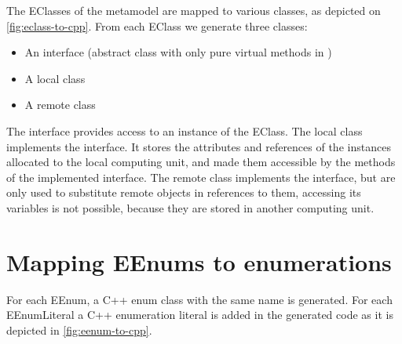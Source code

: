 The EClasses of the metamodel are mapped to various \cpp{} classes, as depicted on \mbox{\autoref{fig:eclass-to-cpp}}.
From each EClass we generate three \cpp{} classes:

\begin{itemize}
	\item An interface (abstract class with only pure virtual methods in \cpp{})
	\item A local class
	\item A remote class
\end{itemize}


The interface provides access to an instance of the EClass.
The local class implements the interface. It stores the attributes and references of the instances allocated to the local computing unit, and made them accessible by the methods of the implemented interface.
The remote class implements the interface, but are only used to substitute remote objects in references to them, accessing its variables is not possible, because they are stored in another computing unit. 

\section{Mapping EEnums to \protect\cpptt{} enumerations }

For each EEnum, a C++ enum class with the same name is generated. For each EEnumLiteral a C++ enumeration literal is added in the generated code as it is depicted in \autoref{fig:eenum-to-cpp}.

